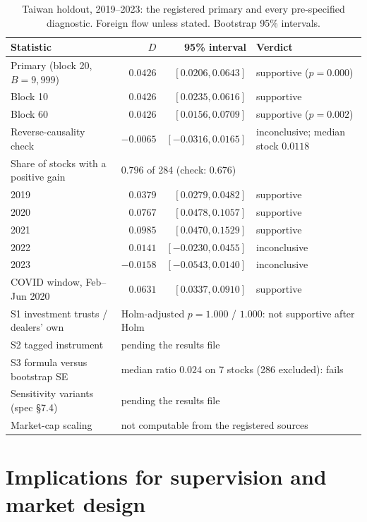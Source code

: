 \documentclass[12pt]{article}
\theoremstyle{definition}
\theoremstyle{remark}
\begin{document}
\begin{table}[htbp]\centering\small
\caption{Taiwan holdout, 2019--2023: the registered primary and every pre-specified diagnostic. Foreign flow unless stated. Bootstrap 95\% intervals.}\label{tab:taiwan}
\begin{tabular}{lrrl}
\toprule
Statistic & $D$ & 95\% interval & Verdict\\
\midrule
Primary (block 20, $B=9{,}999$) & $0.0426$ & $[0.0206, 0.0643]$ & supportive ($p=0.000$)\\
Block 10 & $0.0426$ & $[0.0235, 0.0616]$ & supportive\\
Block 60 & $0.0426$ & $[0.0156, 0.0709]$ & supportive ($p=0.002$)\\
Reverse-causality check & $-0.0065$ & $[-0.0316, 0.0165]$ & inconclusive; median stock $0.0118$\\
Share of stocks with a positive gain & \multicolumn{3}{l}{$0.796$ of 284 (check: $0.676$)}\\
2019 & $0.0379$ & $[0.0279, 0.0482]$ & supportive\\
2020 & $0.0767$ & $[0.0478, 0.1057]$ & supportive\\
2021 & $0.0985$ & $[0.0470, 0.1529]$ & supportive\\
2022 & $0.0141$ & $[-0.0230, 0.0455]$ & inconclusive\\
2023 & $-0.0158$ & $[-0.0543, 0.0140]$ & inconclusive\\
COVID window, Feb--Jun 2020 & $0.0631$ & $[0.0337, 0.0910]$ & supportive\\
S1 investment trusts / dealers' own & \multicolumn{3}{l}{Holm-adjusted $p=1.000$ / $1.000$: not supportive after Holm}\\
S2 tagged instrument & \multicolumn{3}{l}{pending the results file}\\
S3 formula versus bootstrap SE & \multicolumn{3}{l}{median ratio $0.024$ on 7 stocks (286 excluded): fails}\\
Sensitivity variants (spec \S7.4) & \multicolumn{3}{l}{pending the results file}\\
Market-cap scaling & \multicolumn{3}{l}{not computable from the registered sources}\\
\bottomrule
\end{tabular}
\end{table}

\section{Implications for supervision and market design}\label{sec:policy}
\end{document}

